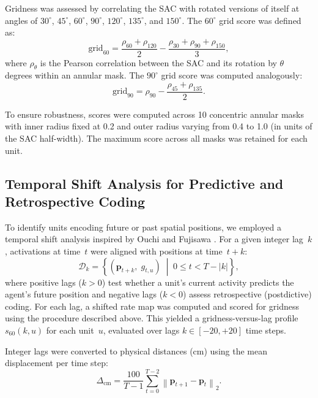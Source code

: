 \documentclass[11pt]{article}
\begin{document}
Gridness was assessed by correlating the SAC with rotated versions of itself at angles of $30^\circ$, $45^\circ$, $60^\circ$, $90^\circ$, $120^\circ$, $135^\circ$, and $150^\circ$. The $60^\circ$ grid score was defined as:
\begin{equation}
    \mathrm{grid}_{60} = \frac{\rho_{60} + \rho_{120}}{2} - \frac{\rho_{30} + \rho_{90} + \rho_{150}}{3},
\end{equation}
where $\rho_\theta$ is the Pearson correlation between the SAC and its rotation by $\theta$ degrees within an annular mask. The $90^\circ$ grid score was computed analogously:
\begin{equation}
    \mathrm{grid}_{90} = \rho_{90} - \frac{\rho_{45} + \rho_{135}}{2}.
\end{equation}

To ensure robustness, scores were computed across 10 concentric annular masks with inner radius fixed at 0.2 and outer radius varying from 0.4 to 1.0 (in units of the SAC half-width). The maximum score across all masks was retained for each unit.


\subsection*{Temporal Shift Analysis for Predictive and Retrospective Coding}

To identify units encoding future or past spatial positions, we employed a temporal shift analysis inspired by Ouchi and Fujisawa \cite{ouchi2024}. For a given integer lag~$k$, activations at time~$t$ were aligned with positions at time~$t + k$:
\begin{equation}
    \mathcal{D}_k = \left\{\!\left(\mathbf{p}_{t+k},\; g_{t,u}\right) \;\middle|\; 0 \le t < T - |k| \right\},
\end{equation}
where positive lags ($k > 0$) test whether a unit's current activity predicts the agent's future position and negative lags ($k < 0$) assess retrospective (postdictive) coding. For each lag, a shifted rate map was computed and scored for gridness using the procedure described above. This yielded a gridness-versus-lag profile $s_{60}(k, u)$ for each unit~$u$, evaluated over lags $k \in [-20, +20]$ time steps.

Integer lags were converted to physical distances (cm) using the mean displacement per time step:
\begin{equation}
    \Delta_{\mathrm{cm}} = \frac{100}{T-1}\sum_{t=0}^{T-2}\left\lVert\mathbf{p}_{t+1} - \mathbf{p}_t\right\rVert_2.
\end{equation}
\end{document}
